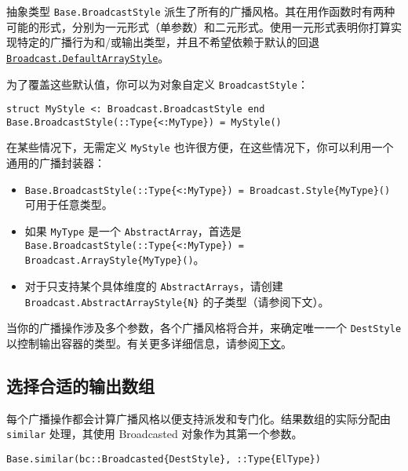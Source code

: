 抽象类型 \texttt{Base.BroadcastStyle} 派生了所有的广播风格。其在用作函数时有两种可能的形式，分别为一元形式（单参数）和二元形式。使用一元形式表明你打算实现特定的广播行为和/或输出类型，并且不希望依赖于默认的回退 \hyperlink{5203521679854231580}{\texttt{Broadcast.DefaultArrayStyle}}。



为了覆盖这些默认值，你可以为对象自定义 \texttt{BroadcastStyle}：




\begin{verbatim}
struct MyStyle <: Broadcast.BroadcastStyle end
Base.BroadcastStyle(::Type{<:MyType}) = MyStyle()
\end{verbatim}



在某些情况下，无需定义 \texttt{MyStyle} 也许很方便，在这些情况下，你可以利用一个通用的广播封装器：



\begin{itemize}
\item \texttt{Base.BroadcastStyle(::Type\{<:MyType\}) = Broadcast.Style\{MyType\}()} 可用于任意类型。


\item 如果 \texttt{MyType} 是一个 \texttt{AbstractArray}，首选是 \texttt{Base.BroadcastStyle(::Type\{<:MyType\}) = Broadcast.ArrayStyle\{MyType\}()}。


\item 对于只支持某个具体维度的 \texttt{AbstractArrays}，请创建 \texttt{Broadcast.AbstractArrayStyle\{N\}} 的子类型（请参阅下文）。

\end{itemize}


当你的广播操作涉及多个参数，各个广播风格将合并，来确定唯一一个 \texttt{DestStyle} 以控制输出容器的类型。有关更多详细信息，请参阅\hyperlink{17567878480973592299}{下文}。



\hypertarget{4710253435053989143}{}


\subsection{选择合适的输出数组}



每个广播操作都会计算广播风格以便支持派发和专门化。结果数组的实际分配由 \texttt{similar} 处理，其使用 Broadcasted 对象作为其第一个参数。




\begin{verbatim}
Base.similar(bc::Broadcasted{DestStyle}, ::Type{ElType})
\end{verbatim}



